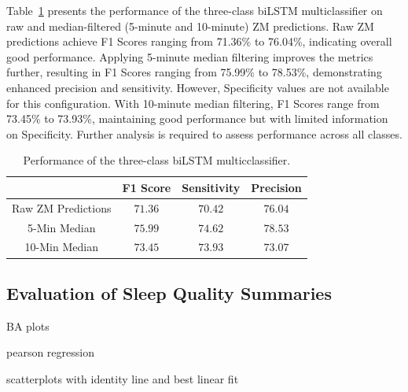 \documentclass[
  super,
  preprint,
  3p]{elsarticle}
\begin{document}
Table~\ref{tbl-biLSTM_performance} presents the performance of the
three-class biLSTM multiclassifier on raw and median-filtered (5-minute
and 10-minute) ZM predictions. Raw ZM predictions achieve F1 Scores
ranging from 71.36\% to 76.04\%, indicating overall good performance.
Applying 5-minute median filtering improves the metrics further,
resulting in F1 Scores ranging from 75.99\% to 78.53\%, demonstrating
enhanced precision and sensitivity. However, Specificity values are not
available for this configuration. With 10-minute median filtering, F1
Scores range from 73.45\% to 73.93\%, maintaining good performance but
with limited information on Specificity. Further analysis is required to
assess performance across all classes.

\hypertarget{tbl-biLSTM_performance}{}
\begin{longtable}{cccc}
\caption{\label{tbl-biLSTM_performance}Performance of the three-class biLSTM multicclassifier. }\tabularnewline

\toprule
 & F1 Score & Sensitivity & Precision \\ 
\midrule
Raw ZM Predictions & $71.36$ & $70.42$ & $76.04$ \\ 
5-Min Median & $75.99$ & $74.62$ & $78.53$ \\ 
10-Min Median & $73.45$ & $73.93$ & $73.07$ \\ 
\bottomrule
\end{longtable}

\hypertarget{evaluation-of-sleep-quality-summaries}{%
\subsection{Evaluation of Sleep Quality
Summaries}\label{evaluation-of-sleep-quality-summaries}}

BA plots

pearson regression

scatterplots with identity line and best linear fit

\newpage


\renewcommand\refname{References}
  
\end{document}
